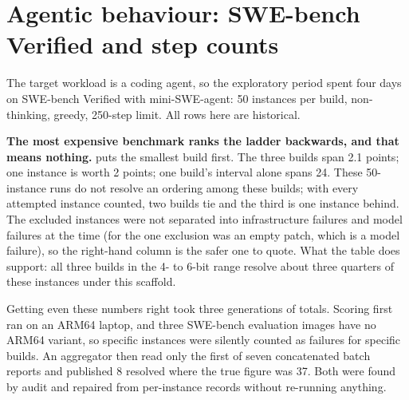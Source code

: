 \section{Agentic behaviour: SWE-bench Verified and step counts}\label{sec:agentic}

The target workload is a coding agent, so the exploratory period spent four days on SWE-bench Verified
with mini-SWE-agent: 50 instances per build, non-thinking, greedy, 250-step limit. All rows here are
historical\hist.

\begin{table}[t]
\centering\small
\caption{SWE-bench Verified\hist, 50 instances per build. ``Scored'' excludes instances that produced
no evaluable patch; the last column counts every such instance as a failure, which is the conservative
reading and puts all builds on the same 50 instances. This is \emph{Verified}, not SWE-bench Pro (on
which Qwen reports 61.7 for this model); the two are not comparable.}\label{tab:swe}
\end{table}

\textbf{The most expensive benchmark ranks the ladder backwards, and that means nothing.}
 puts the smallest build first. The three builds span 2.1 points; one instance is worth
2 points; one build's interval alone spans 24. These 50-instance runs do not resolve an ordering among these builds; with every attempted instance
counted, two builds tie and the third is one instance behind. The excluded instances were not
separated into infrastructure failures and model failures at the time (for \Qsix{} the one exclusion
was an empty patch, which is a model failure), so the right-hand column is the safer one to quote. What the
table does support: all three builds in the 4- to 6-bit range resolve about three quarters of these
instances under this scaffold.

Getting even these numbers right took three generations of totals. Scoring first ran on an ARM64
laptop, and three SWE-bench evaluation images have no ARM64 variant, so specific instances were
silently counted as failures for specific builds. An aggregator then read only the first of seven
concatenated batch reports and published 8 resolved where the true figure was 37. Both were found
by audit and repaired from per-instance records without re-running anything.

